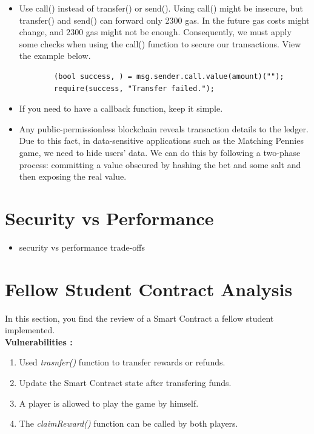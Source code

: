 \documentclass[12pt,a4paper]{article}
\begin{document}
\begin{itemize}
    \item Use call() instead of transfer() or send().
    Using call() might be insecure, but transfer() and send() can forward only 2300 gas. In the future 
    gas costs might change, and 2300 gas might not be enough. Consequently, we must apply some
    checks when using the call() function to secure our transactions. View the example below. \\
    \begin{lstlisting}
        (bool success, ) = msg.sender.call.value(amount)(""); 
        require(success, "Transfer failed.");
    \end{lstlisting}
    \item If you need to have a callback function, keep it simple.
    \item Any public-permissionless blockchain reveals transaction details to 
    the ledger. Due to this fact, in data-sensitive applications such as the
    Matching Pennies game, we need to hide users' data. We can do this by following a
    two-phase process: committing a value obscured by hashing the bet and some salt
    and then exposing the real value.
\end{itemize}

\section*{Security vs Performance}
\begin{itemize}
        \item security vs performance trade-offs
\end{itemize}

\section*{Fellow Student Contract Analysis}

In this section, you find the review of a Smart Contract a fellow student implemented. \\

\textbf{Vulnerabilities :} 

\begin{enumerate}
    \item Used \emph{trasnfer()} function to transfer rewards or refunds.
    \item Update the Smart Contract state after transfering funds.
    \item A player is allowed to play the game by himself.
    \item The \emph{claimReward()} function can be called by both players.
\end{enumerate}
\end{document}
